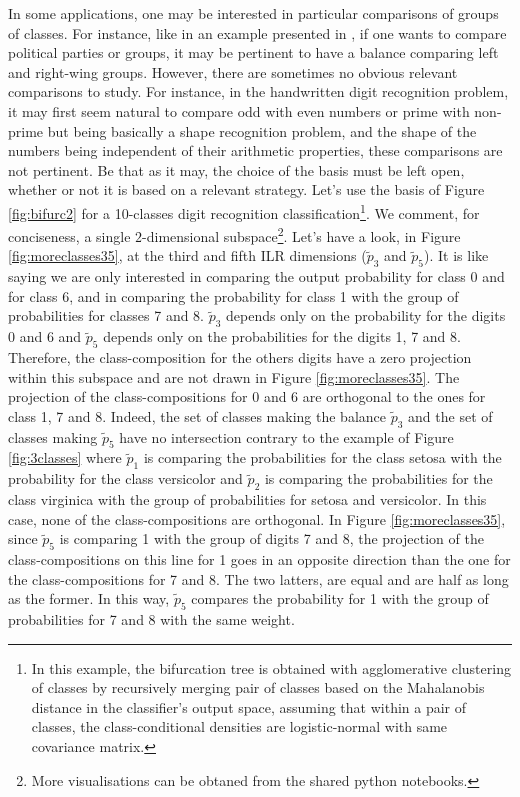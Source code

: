 \documentclass{article}
\theoremstyle{plain}
\theoremstyle{definition}
\theoremstyle{remark}
\begin{document}
In some applications, one may be interested in particular comparisons of groups of classes. For instance, like in an example presented in \cite{egozcue2005groups}, if one wants to compare political parties or groups, it may be pertinent to have a balance comparing left and right-wing groups. However, there are sometimes no obvious relevant comparisons to study. For instance, in the handwritten digit recognition problem, it may first seem natural to compare odd with even numbers or prime with non-prime but being basically a shape recognition problem, and the shape of the numbers being independent of their arithmetic properties, these comparisons are not pertinent. Be that as it may, the choice of the basis must be left open, whether or not it is based on a relevant strategy. Let's use the basis of Figure \ref{fig:bifurc2} for a 10-classes digit recognition classification\footnote{In this example, the bifurcation tree is obtained with agglomerative clustering of classes by recursively merging pair of classes based on the Mahalanobis distance in the classifier's output space, assuming that within a pair of classes, the class-conditional densities are logistic-normal \cite{aitchison1980} with same covariance matrix.}. We comment, for conciseness, a single $2$-dimensional subspace\footnote{More visualisations can be obtaned from the shared python notebooks.}. Let's have a look, in Figure \ref{fig:moreclasses35}, at the third and fifth ILR dimensions ($\tilde{p}_3$ and $\tilde{p}_5$). It is like saying we are only interested in comparing the output probability for class 0 and for class 6, and in comparing the probability for class 1 with the group of probabilities for classes 7 and 8. $\tilde{p}_3$ depends only on the probability for the digits 0 and 6 and $\tilde{p}_5$ depends only on the probabilities for the digits 1, 7 and 8. Therefore, the class-composition for the others digits have a zero projection within this subspace and are not drawn in Figure \ref{fig:moreclasses35}. The projection of the class-compositions for 0 and 6 are orthogonal to the ones for class 1, 7 and 8. Indeed, the set of classes making the balance $\tilde{p}_3$ and the set of classes making $\tilde{p}_5$ have no intersection contrary to the example of Figure \ref{fig:3classes} where $\tilde{p}_1$ is comparing the probabilities for the class setosa with the probability for the class versicolor and $\tilde{p}_2$ is comparing the probabilities for the class virginica with the group of probabilities for setosa and versicolor. In this case, none of the class-compositions are orthogonal. In Figure \ref{fig:moreclasses35}, since $\tilde{p}_5$ is comparing 1 with the group of digits 7 and 8, the projection of the class-compositions on this line for 1 goes in an opposite direction than the one for the class-compositions for 7 and 8. The two latters, are equal and are half as long as the former. In this way, $\tilde{p}_5$ compares the probability for 1 with the group of probabilities for 7 and 8 with the same weight.
\end{document}
